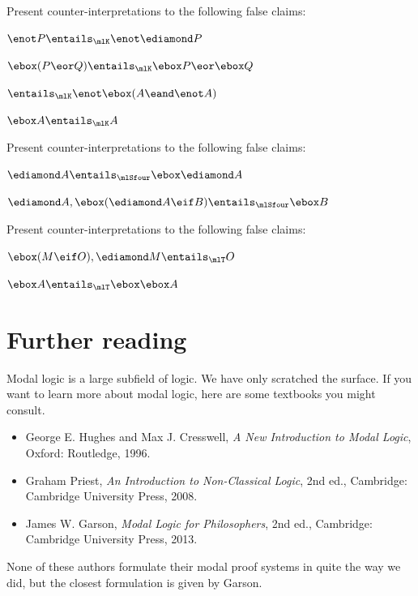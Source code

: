 \practiceproblems

\problempart
Present counter-interpretations to the following false claims:
\begin{compactlist}
	\item $\enot P \entails_\mlK \enot\ediamond P$
	\item $\ebox(P \eor Q)\entails_\mlK \ebox P \eor \ebox Q$
	\item $\entails_\mlK \enot \ebox (A\eand \enot A)$
	\item $\ebox A\entails_\mlK A$
\end{compactlist}

\problempart
Present counter-interpretations to the following false claims:
\begin{compactlist}
	\item $\ediamond A\entails_\mlSfour \ebox\ediamond A$
	\item $\ediamond A, \ebox (\ediamond A \eif B)\entails_\mlSfour\ebox B$
\end{compactlist}

\problempart
Present counter-interpretations to the following false claims:
\begin{compactlist}
	\item $\ebox (M\eif O),\ediamond M\entails_\mlT O$
	\item $\ebox A\entails_\mlT \ebox \ebox A$
\end{compactlist}

\section*{Further reading}

Modal logic is a large subfield of logic. We have only scratched the surface. If you want to learn more about modal logic, here are some textbooks you might consult.

\begin{itemize}
	\item George E. Hughes and Max J. Cresswell, \textit{A New Introduction
	to Modal Logic}, Oxford: Routledge, 1996.
	\item Graham Priest, \textit{An Introduction to Non-Classical Logic},
	2nd ed., Cambridge: Cambridge University Press, 2008.
	\item James W. Garson, \textit{Modal Logic for Philosophers}, 2nd
	ed., Cambridge: Cambridge University Press, 2013.
\end{itemize}

None of these authors formulate their modal proof systems in quite the way we did, but the closest formulation is given by Garson.

